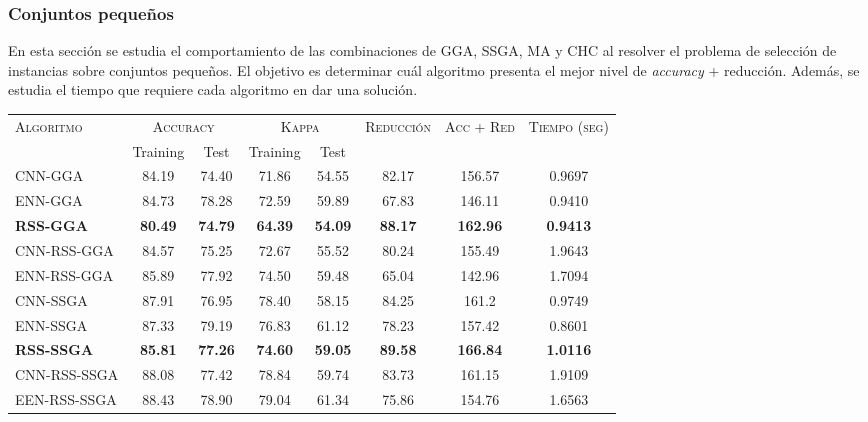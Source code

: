 \subsubsection{Conjuntos pequeños}

En esta sección se estudia el comportamiento de las combinaciones de GGA, SSGA, MA y CHC al resolver el problema de selección de instancias sobre conjuntos pequeños. El objetivo es determinar cuál algoritmo presenta el mejor nivel de \emph{accuracy} + reducción. Además, se estudia el tiempo que requiere cada algoritmo en dar una solución.


\begin{table}[h!]
\centering
\begin{adjustbox}{max width =\textwidth}
\begin{tabular}{l c c c c c c c}
\hline
\multirow{2}{*}{\textsc{Algoritmo}}
	& \multicolumn{2}{c}{\textsc{Accuracy}}
	& \multicolumn{2}{c}{\textsc{Kappa}}
	& \textsc{Reducción}
	& \textsc{Acc + Red}
	& \textsc{Tiempo (seg)} \\
	& Training & Test
	& Training & Test \\ 
\hline
\hline

CNN-GGA    & 84.19 & 74.40 & 71.86 & 54.55 & 82.17 & 156.57 & 0.9697 \\ 
ENN-GGA    & 84.73 & 78.28 & 72.59 & 59.89 & 67.83 & 146.11 & 0.9410 \\
\textbf{RSS-GGA}      & \textbf{80.49} & \textbf{74.79} & \textbf{64.39} & \textbf{54.09} & \textbf{88.17} & \textbf{162.96} & \textbf{0.9413} \\
CNN-RSS-GGA  & 84.57 & 75.25 & 72.67 & 55.52 & 80.24 & 155.49 & 1.9643 \\
ENN-RSS-GGA  & 85.89 & 77.92 & 74.50 & 59.48 & 65.04 & 142.96 & 1.7094 \\

\hline

CNN-SSGA & 87.91 & 76.95 & 78.40 & 58.15 & 84.25 & 161.2 & 0.9749 \\
ENN-SSGA & 87.33 & 79.19 & 76.83 & 61.12 & 78.23 & 157.42 & 0.8601 \\
\textbf{RSS-SSGA} & \textbf{85.81} & \textbf{77.26} & \textbf{74.60} & \textbf{59.05} & \textbf{89.58} & \textbf{166.84} &\textbf{1.0116} \\
CNN-RSS-SSGA & 88.08 & 77.42 & 78.84 & 59.74 & 83.73 & 161.15 & 1.9109 \\
EEN-RSS-SSGA & 88.43 & 78.90 & 79.04 & 61.34 & 75.86 & 154.76 & 1.6563 \\


\end{tabular}
\end{adjustbox}
\end{table}
